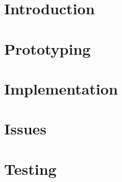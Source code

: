 \section{Introduction}
	\paragraph{}{
	}

\section{Prototyping}
	\paragraph{}{
	}
	
\section{Implementation}
	\paragraph{}{
	}
	
\section{Issues}
	\paragraph{}{
	}
	
\section{Testing}
	\paragraph{}{
	}